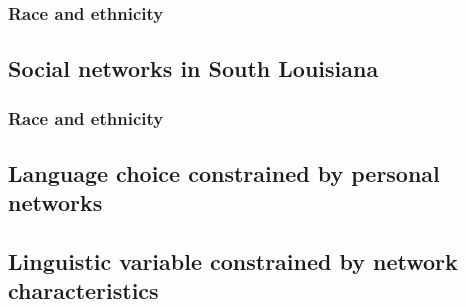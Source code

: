       \subsubsection{Race and ethnicity}
    \subsection{Social networks in South Louisiana}
      \subsubsection{Race and ethnicity}
    \subsection{Language choice constrained by personal networks}
    \subsection{Linguistic variable constrained by network characteristics}
